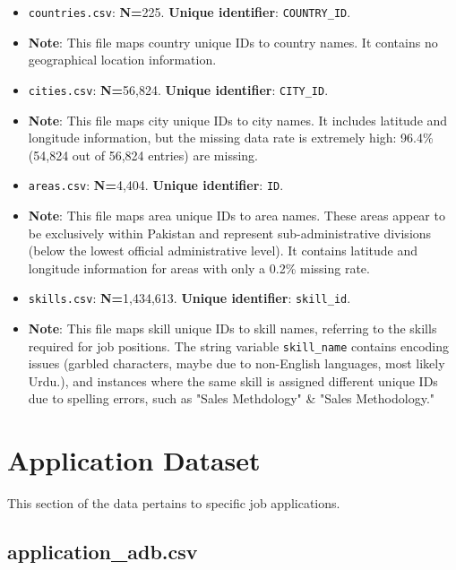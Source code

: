 \documentclass[12pt]{article}
\begin{document}
\begin{itemize}
    \item \texttt{countries.csv}: \textbf{N=}225. \textbf{Unique identifier}: \texttt{COUNTRY\_ID}.
    \item[] \textbf{Note}: This file maps country unique IDs to country names. It contains no geographical location information.

    \item \texttt{cities.csv}: \textbf{N=}56,824. \textbf{Unique identifier}: \texttt{CITY\_ID}.
    \item[] \textbf{Note}: This file maps city unique IDs to city names. It includes latitude and longitude information, but the missing data rate is extremely high: 96.4\% (54,824 out of 56,824 entries) are missing.

    \item \texttt{areas.csv}: \textbf{N=}4,404. \textbf{Unique identifier}: \texttt{ID}.
    \item[] \textbf{Note}: This file maps area unique IDs to area names. These areas appear to be exclusively within Pakistan and represent sub-administrative divisions (below the lowest official administrative level). It contains latitude and longitude information for areas with only a 0.2\% missing rate.

    \item \texttt{skills.csv}: \textbf{N=}1,434,613. \textbf{Unique identifier}: \texttt{skill\_id}.
    \item[] \textbf{Note}: This file maps skill unique IDs to skill names, referring to the skills required for job positions. The string variable \texttt{skill\_name} contains encoding issues (garbled characters, maybe due to non-English languages, most likely
Urdu.), and instances where the same skill is assigned different unique IDs due to spelling errors, such as "Sales Methdology" \& "Sales Methodology."
\end{itemize}





\newpage

\section{Application Dataset}
This section of the data pertains to specific job applications. 

\subsection{application\_adb.csv}
\end{document}
